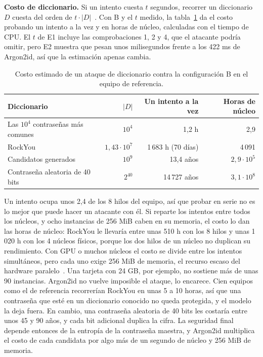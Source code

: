 \documentclass[11pt,letterpaper]{article}
\begin{document}
\textbf{Costo de diccionario.} Si un intento cuesta $t$ segundos, recorrer un diccionario $D$ cuesta del orden de $t\cdot|D|$~\cite[§18.4.4]{boneh}. Con B y el $t$ medido, la tabla~\ref{tab:diccionario} da el costo probando un intento a la vez y en horas de núcleo, calculadas con el tiempo de CPU. El $t$ de E1 incluye las comprobaciones 1, 2 y 4, que el atacante podría omitir, pero E2 muestra que pesan unos milisegundos frente a los 422 ms de Argon2id, así que la estimación apenas cambia.

\begin{table}[h]
\centering\small
\caption{Costo estimado de un ataque de diccionario contra la configuración B en el equipo de referencia.}
\label{tab:diccionario}
\begin{tabular}{@{}lrrr@{}}
\toprule
Diccionario & $|D|$ & Un intento a la vez & Horas de núcleo \\
\midrule
Las $10^4$ contraseñas más comunes & $10^4$ & 1,2 h & 2,9 \\
RockYou & $1{,}43\cdot 10^7$ & 1\,683 h (70 días) & 4\,091 \\
Candidatos generados & $10^9$ & 13,4 años & $2{,}9\cdot 10^5$ \\
Contraseña aleatoria de 40 bits & $2^{40}$ & 14\,727 años & $3{,}1\cdot 10^8$ \\
\bottomrule
\end{tabular}
\end{table}

Un intento ocupa unos 2,4 de los 8 hilos del equipo, así que probar en serie no es lo mejor que puede hacer un atacante con él. Si reparte los intentos entre todos los núcleos, y ocho instancias de 256 MiB caben en su memoria, el costo lo dan las horas de núcleo: RockYou le llevaría entre unas 510 h con los 8 hilos y unas 1\,020 h con los 4 núcleos físicos, porque los dos hilos de un núcleo no duplican su rendimiento. Con GPU o muchos núcleos el costo se divide entre los intentos simultáneos, pero cada uno exige 256 MiB de memoria, el recurso escaso del hardware paralelo~\cite{rfc9106}. Una tarjeta con 24 GB, por ejemplo, no sostiene más de unas 90 instancias. Argon2id no vuelve imposible el ataque, lo encarece. Cien equipos como el de referencia recorrerían RockYou en unas 5 a 10 horas, así que una contraseña que esté en un diccionario conocido no queda protegida, y el modelo la deja fuera. En cambio, una contraseña aleatoria de 40 bits les costaría entre unos 45 y 90 años, y cada bit adicional duplica la cifra. La seguridad final depende entonces de la entropía de la contraseña maestra, y Argon2id multiplica el costo de cada candidata por algo más de un segundo de núcleo y 256 MiB de memoria.
\end{document}
